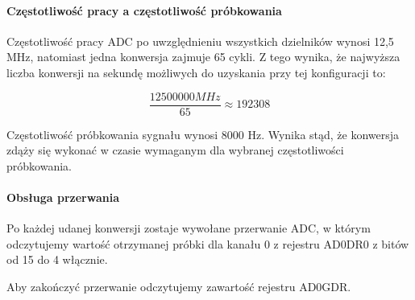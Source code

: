 \paragraph{Częstotliwość pracy a częstotliwość próbkowania}

    Częstotliwość pracy ADC po uwzględnieniu wszystkich dzielników wynosi
    12,5 MHz, natomiast jedna konwersja zajmuje 65 cykli. Z tego wynika,
    że najwyższa liczba konwersji na sekundę możliwych do uzyskania przy tej
    konfiguracji to:

    \begin{equation}
        \frac{12500000MHz}{65} \approx 192308
    \end{equation}

    Częstotliwość próbkowania sygnału wynosi 8000 Hz. Wynika stąd, że konwersja
    zdąży się wykonać w czasie wymaganym dla wybranej częstotliwości
    próbkowania.

\paragraph{Obsługa przerwania}

    Po każdej udanej konwersji zostaje wywołane przerwanie ADC, w którym
    odczytujemy wartość otrzymanej próbki dla kanału 0 z rejestru AD0DR0
    z bitów od 15 do 4 włącznie.

    Aby zakończyć przerwanie odczytujemy zawartość rejestru AD0GDR.
    
